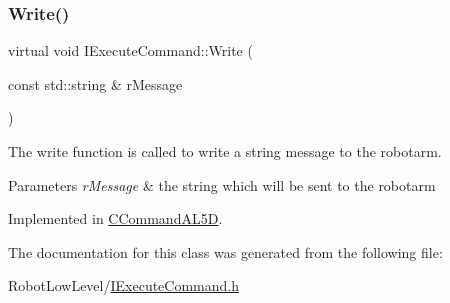 \subsubsection{\texorpdfstring{Write()}{Write()}}
{\footnotesize\ttfamily virtual void I\+Execute\+Command\+::\+Write (\begin{DoxyParamCaption}\item[{const std\+::string \&}]{r\+Message }\end{DoxyParamCaption})\hspace{0.3cm}{\ttfamily [pure virtual]}}



The write function is called to write a string message to the robotarm. 


\begin{DoxyParams}{Parameters}
{\em r\+Message} & the string which will be sent to the robotarm \\
\hline
\end{DoxyParams}


Implemented in \hyperlink{classCCommandAL5D_a308c945d4ed4009c85158a72e5db1bd5}{C\+Command\+A\+L5D}.



The documentation for this class was generated from the following file\+:\begin{DoxyCompactItemize}
\item 
Robot\+Low\+Level/\hyperlink{IExecuteCommand_8h}{I\+Execute\+Command.\+h}\end{DoxyCompactItemize}

